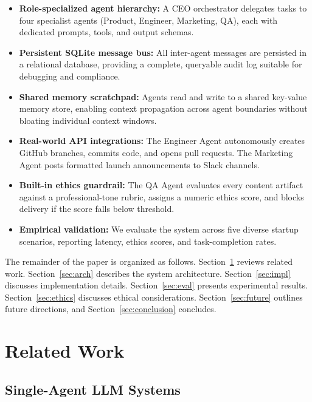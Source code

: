\documentclass[conference]{IEEEtran}
\begin{document}
\begin{itemize}
    \item \textbf{Role-specialized agent hierarchy:} A CEO orchestrator delegates tasks to four specialist agents (Product, Engineer, Marketing, QA), each with dedicated prompts, tools, and output schemas.
    \item \textbf{Persistent SQLite message bus:} All inter-agent messages are persisted in a relational database, providing a complete, queryable audit log suitable for debugging and compliance.
    \item \textbf{Shared memory scratchpad:} Agents read and write to a shared key-value memory store, enabling context propagation across agent boundaries without bloating individual context windows.
    \item \textbf{Real-world API integrations:} The Engineer Agent autonomously creates GitHub branches, commits code, and opens pull requests. The Marketing Agent posts formatted launch announcements to Slack channels.
    \item \textbf{Built-in ethics guardrail:} The QA Agent evaluates every content artifact against a professional-tone rubric, assigns a numeric ethics score, and blocks delivery if the score falls below threshold.
    \item \textbf{Empirical validation:} We evaluate the system across five diverse startup scenarios, reporting latency, ethics scores, and task-completion rates.
\end{itemize}

The remainder of the paper is organized as follows. Section~\ref{sec:related} reviews related work. Section~\ref{sec:arch} describes the system architecture. Section~\ref{sec:impl} discusses implementation details. Section~\ref{sec:eval} presents experimental results. Section~\ref{sec:ethics} discusses ethical considerations. Section~\ref{sec:future} outlines future directions, and Section~\ref{sec:conclusion} concludes.

\section{Related Work}
\label{sec:related}

\subsection{Single-Agent LLM Systems}
\end{document}
